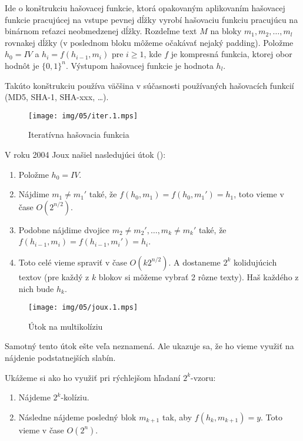 Ide o konštrukciu hašovacej funkcie, ktorá opakovaným aplikovaním
hašovacej funkcie pracujúcej na vstupe pevnej dĺžky vyrobí hašovaciu
funkciu pracujúcu na binárnom reťazci neobmedzenej dĺžky.
Rozdeľme text $M$ na bloky $m_1, m_2, \dots, m_l$ rovnakej dĺžky
(v poslednom bloku môžeme očakávať nejaký padding).
Položme $h_0 = IV$ a $h_i = f(h_{i-1}, m_i)$ pre $i \geq 1$, kde $f$ 
je kompresná funkcia, ktorej obor hodnôt je $\{0,1\}^n$.
Výstupom hašovacej funkcie je hodnota $h_l$.

Takúto konštrukciu 
používa väčšina v súčasnosti používaných hašovacích funkcií
(MD5, SHA-1, SHA-xxx, \dots).

\begin{figure}[h!]
    \centering
    \texttt{[image: img/05/iter.1.mps]}
    \caption{Iteratívna hašovacia funkcia}
    \label{fig:iter}
\end{figure}


\noindent
V roku 2004 Joux našiel nasledujúci útok (\cite{Joux04}):

\begin{enumerate}
    \itemsep -1.2mm
    \item Položme $h_0 = IV$.

    \item Nájdime $m_1 \neq m_1'$ také, že $f(h_0, m_1) = f(h_0, m_1') = h_1$, 
        toto vieme v čase $O(2^{n/2})$.

    \item Podobne nájdime dvojice $m_2 \neq m_2', \dots, m_k \neq m_k'$ také, 
        že $f(h_{i-1}, m_i) = f(h_{i-1}, m_i') = h_i$.

    \item Toto celé vieme spraviť v čase $O(k 2^{n/2})$. A dostaneme $2^k$ 
        kolidujúcich textov (pre každý z $k$ blokov si môžeme vybrať
        2 rôzne texty). Haš každého z nich bude $h_k$.
\end{enumerate}

\begin{figure}[h!]
    \label{fig:joux1}
    \centering
    \texttt{[image: img/05/joux.1.mps]}
    \caption{Útok na multikolíziu}
\end{figure}


Samotný tento útok ešte veľa neznamená. Ale ukazuje sa, že
ho vieme využiť na nájdenie podstatnejších slabín.

Ukážeme si ako ho využiť pri rýchlejšom hľadaní $2^k$-vzoru:
\begin{enumerate}
    \itemsep -1.2mm

    \item Nájdeme $2^k$-kolíziu.

    \item Následne nájdeme posledný blok $m_{k+1}$ tak,
        aby $f(h_k, m_{k+1}) = y$. Toto vieme v čase $O(2^n)$.
\end{enumerate}

